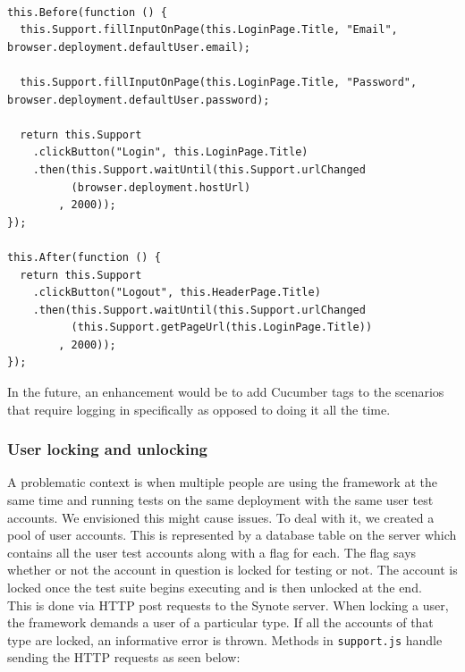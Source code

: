 \begin{listing}[H]
\begin{verbatim}

this.Before(function () {
  this.Support.fillInputOnPage(this.LoginPage.Title, "Email", browser.deployment.defaultUser.email);

  this.Support.fillInputOnPage(this.LoginPage.Title, "Password", browser.deployment.defaultUser.password);

  return this.Support
    .clickButton("Login", this.LoginPage.Title)
    .then(this.Support.waitUntil(this.Support.urlChanged
          (browser.deployment.hostUrl)
        , 2000));
});

this.After(function () {
  return this.Support
    .clickButton("Logout", this.HeaderPage.Title)
    .then(this.Support.waitUntil(this.Support.urlChanged
          (this.Support.getPageUrl(this.LoginPage.Title))
        , 2000));
});

\end{verbatim}
\label{lst:login-and-logout-hooks}
\end{listing}

In the future, an enhancement would be to add Cucumber tags to the scenarios that require logging in specifically as opposed to doing it all the time.

\subsubsection{User locking and unlocking}
\label{subsubsec:user-locking-and-unlocking}

A problematic context is when multiple people are using the framework at the same time and running tests on the same deployment with the same user test accounts. We envisioned this might cause issues. To deal with it, we created a pool of user accounts. This is represented by a database table on the server which contains all the user test accounts along with a flag for each. The flag says whether or not the account in question is locked for testing or not. The account is locked once the test suite begins executing and is then unlocked at the end.
\\

This is done via HTTP post requests to the Synote server. When locking a user, the framework demands a user of a particular type. If all the accounts of that type are locked, an informative error is thrown. Methods in \texttt{support.js} handle sending the HTTP requests as seen below:

